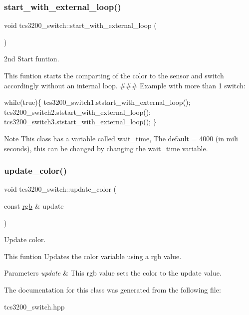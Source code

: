\subsubsection{\texorpdfstring{start\+\_\+with\+\_\+external\+\_\+loop()}{start\_with\_external\_loop()}}
{\footnotesize\ttfamily void tcs3200\+\_\+switch\+::start\+\_\+with\+\_\+external\+\_\+loop (\begin{DoxyParamCaption}{ }\end{DoxyParamCaption})\hspace{0.3cm}{\ttfamily [inline]}}



2nd Start funtion. 

This funtion starts the comparting of the color to the sensor and switch accordingly without an internal loop. \#\#\# Example with more than 1 switch\+: 
\begin{DoxyCode}
\textcolor{keywordflow}{while}(\textcolor{keyword}{true})\{
    tcs3200\_switch1.ststart\_with\_external\_loop();
    tcs3200\_switch2.ststart\_with\_external\_loop();
    tcs3200\_switch3.ststart\_with\_external\_loop();
\}
\end{DoxyCode}
 \begin{DoxyNote}{Note}
This class has a variable called wait\+\_\+time, The default = 4000 (in mili seconds), this can be changed by changing the wait\+\_\+time variable. 
\end{DoxyNote}
\mbox{\label{classtcs3200__switch_aaf7221f303cb22b5f3ac9ff749023abb}} 
\subsubsection{\texorpdfstring{update\+\_\+color()}{update\_color()}}
{\footnotesize\ttfamily void tcs3200\+\_\+switch\+::update\+\_\+color (\begin{DoxyParamCaption}\item[{const \hyperlink{structrgb}{rgb} \&}]{update }\end{DoxyParamCaption})\hspace{0.3cm}{\ttfamily [inline]}}



Update color. 

This funtion Updates the color variable using a rgb value. 
\begin{DoxyParams}{Parameters}
{\em update} & This rgb value sets the color to the update value. \\
\hline
\end{DoxyParams}


The documentation for this class was generated from the following file\+:\begin{DoxyCompactItemize}
\item 
tcs3200\+\_\+switch.\+hpp\end{DoxyCompactItemize}
